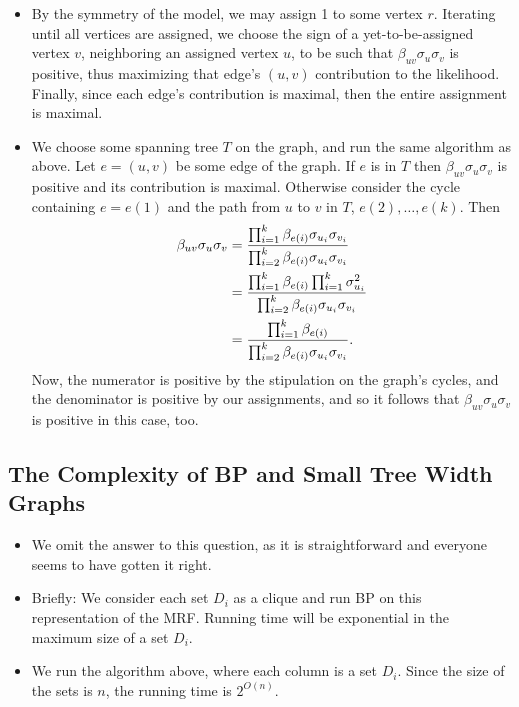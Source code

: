 \documentclass[11pt]{article} \usepackage{amssymb}
\begin{document}
\begin{itemize}
\item By the symmetry of the model, we may assign 1 to some vertex
  $r$. Iterating until all vertices are assigned, we choose the sign
  of a yet-to-be-assigned vertex $v$, neighboring an assigned vertex
  $u$, to be such that $\beta_{uv}\sigma_u\sigma_v$ is positive, thus
  maximizing that edge's $(u,v)$ contribution to the
  likelihood. Finally, since each edge's contribution is maximal, then
  the entire assignment is maximal.

\item We choose some spanning tree $T$ on the graph, and run the same
  algorithm as above. Let $e=(u,v)$ be some edge of the graph. If $e$
  is in $T$ then $\beta_{uv}\sigma_u\sigma_v$ is positive and its
  contribution is maximal. Otherwise consider the cycle containing $e=e(1)$
  and the path from $u$ to $v$ in $T$, $e(2),\ldots,e(k)$. Then 
  \begin{align*}
    \beta_{uv}\sigma_u\sigma_v &=
    {\prod_{i=1}^k\beta_{e(i)}\sigma_{u_i}\sigma_{v_i}
      \over
      \prod_{i=2}^k\beta_{e(i)}\sigma_{u_i}\sigma_{v_i}
    }
    \\ &= 
    {\prod_{i=1}^k\beta_{e(i)}\prod_{i=1}^k\sigma_{u_i}^2
      \over
      \prod_{i=2}^k\beta_{e(i)}\sigma_{u_i}\sigma_{v_i}
    }
    \\ &= 
    {\prod_{i=1}^k\beta_{e(i)}
      \over
      \prod_{i=2}^k\beta_{e(i)}\sigma_{u_i}\sigma_{v_i}
    }.
  \end{align*}
  Now, the numerator is positive by the stipulation on the graph's
  cycles, and the denominator is positive by our assignments, and so
  it follows that  $\beta_{uv}\sigma_u\sigma_v$ is positive in this
  case, too.
\end{itemize}


\subsection{The Complexity of BP and Small Tree Width Graphs}
\begin{itemize}
\item We omit the answer to this question, as it is straightforward
  and everyone seems to have gotten it right.
\item Briefly: We consider each set $D_i$ as a clique and run BP on
  this representation of the MRF. Running time will be exponential in
  the maximum size of a set $D_i$. 
\item We run the algorithm above, where each column is a set
  $D_i$. Since the size of the sets is $n$, the running time is $2^{O(n)}$.
\end{itemize}
\end{document}

